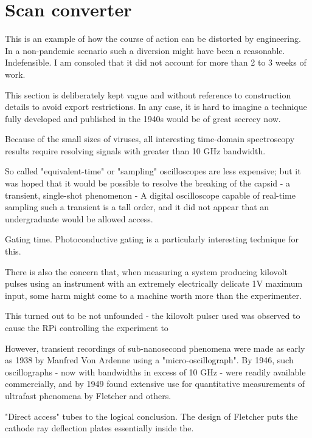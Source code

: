 \documentclass[paper.tex]{subfiles}
\begin{document}
\section{Scan converter}

\begin{autem}
This is an example of how the course of action can be distorted by engineering. In a non-pandemic scenario such a diversion might have been a reasonable. Indefensible. I am consoled that it did not account for more than 2 to 3 weeks of work.
\end{autem}


\begin{autem}
	This section is deliberately kept vague and without reference to construction details to avoid export restrictions. In any case, it is hard to imagine a technique fully developed and published in the 1940s would be of great secrecy now. 
\end{autem}

Because of the small sizes of viruses, all interesting time-domain spectroscopy results require resolving signals with greater than 10 GHz bandwidth.

So called "equivalent-time" or "sampling" oscilloscopes are less expensive; but it was hoped that it would be possible to resolve the breaking of the capsid - a transient, single-shot phenomenon -   A digital oscilloscope capable of real-time sampling such a transient is a tall order, and it did not appear that an undergraduate would be allowed access.

Gating time. Photoconductive gating is a particularly interesting technique for this.

There is also the concern that, when measuring a system producing kilovolt pulses using an instrument with an extremely electrically delicate 1V maximum input, some harm might come to a machine worth more than the experimenter. 

This turned out to be not unfounded - the kilovolt pulser used was observed to cause the RPi controlling the experiment to 

However, transient recordings of sub-nanosecond phenomena were made as early as 1938 by Manfred Von Ardenne using a "micro-oscillograph". By 1946, such oscillographs - now with bandwidths in excess of 10 GHz - were readily available commercially\cite{3beam1946}, and by 1949 found extensive use for quantitative measurements of ultrafast phenomena by Fletcher\cite{Production1949} and others. 

"Direct access" tubes to the logical conclusion. The design of Fletcher puts the cathode ray deflection plates essentially inside the.
\end{document}
